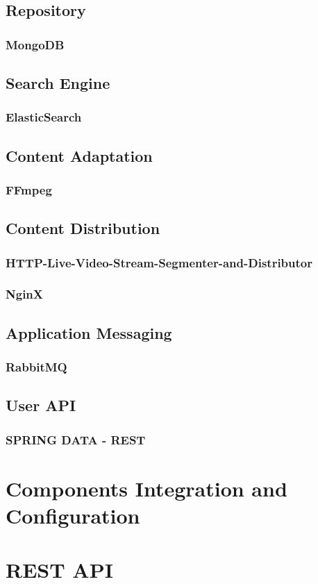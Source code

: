 	\subsection{Repository\label{sec:des_repo}}
	\subsubsection{MongoDB\label{sec:impl_mon}}
	
	\subsection{Search Engine\label{sec:des_se_en}}
	\subsubsection{ElasticSearch\label{sec:impl_el_se}}
	
	\subsection{Content Adaptation\label{sec:des_ar_ov}}	
	\subsubsection{FFmpeg\label{sec:impl_ff}}
	
	\subsection{Content Distribution\label{sec:des_cdn}}
	\subsubsection{HTTP-Live-Video-Stream-Segmenter-and-Distributor\label{sec:impl_http_li}}
	\subsubsection{NginX\label{sec:impl_ngi}}
	
	\subsection{Application Messaging\label{sec:des_me}}
	\subsubsection{RabbitMQ\label{sec:impl_ra_mq}}
	
	\subsection{User API\label{sec:des_api}}
	\subsubsection{SPRING DATA - REST\label{sec:des_api}}

\section{Components Integration and Configuration\label{sec:impl_comp_in}}

\section{REST API\label{sec:impl_rest_api}}